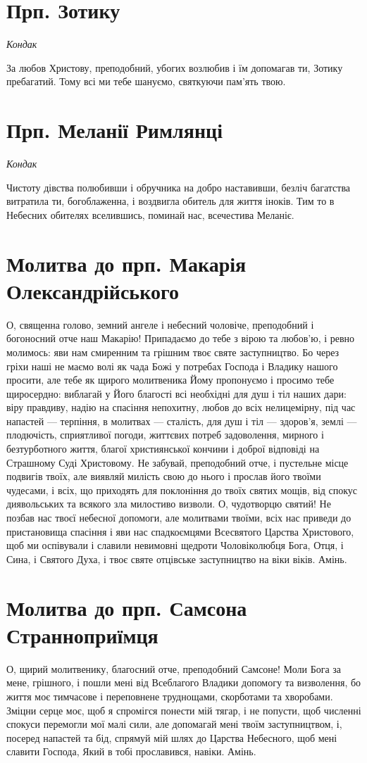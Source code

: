\documentclass[chapters.tex]{subfiles}
\begin{document}
\section{Прп. Зотику}
\emph{Кондак}

За любов Христову, преподобний, убогих возлюбив і їм допомагав ти, Зотику пребагатий. Тому всі ми тебе шануємо, святкуючи пам’ять твою.

\section{Прп. Меланії Римлянці}
\emph{Кондак}

Чистоту дівства полюбивши і обручника на добро наставивши, безліч багатства витратила ти, богоблаженна, і воздвигла обитель для життя іноків. Тим то в Небесних обителях вселившись, поминай нас, всечестива Меланіє.

\section{Молитва до прп. Макарія Олександрійського}
О, священна голово, земний ангеле і небесний чоловіче, преподобний і богоносний отче наш Макарію! Припадаємо до тебе з вірою та любов’ю, і ревно молимось: яви нам смиренним та грішним твоє святе заступництво. Бо через гріхи наші не маємо волі як чада Божі у потребах Господа і Владику нашого просити, але тебе як щирого молитвеника Йому пропонуємо і просимо тебе щиросердно: виблагай у Його благості всі необхідні для душ і тіл наших дари: віру правдиву, надію на спасіння непохитну, любов до всіх нелицемірну, під час напастей — терпіння, в молитвах — сталість, для душ і тіл — здоров’я, землі — плодючість, сприятливої погоди, життєвих потреб задоволення, мирного і безтурботного життя, благої християнської кончини і доброї відповіді на Страшному Суді Христовому. Не забувай, преподобний отче, і пустельне місце подвигів твоїх, але виявляй милість свою до нього і прослав його твоїми чудесами, і всіх, що приходять для поклоніння до твоїх святих мощів, від спокус диявольських та всякого зла милостиво визволи. О, чудотворцю святий! Не позбав нас твоєї небесної допомоги, але молитвами твоїми, всіх нас приведи до пристановища спасіння і яви нас спадкоємцями Всесвятого Царства Христового, щоб ми оспівували і славили невимовні щедроти Чоловіколюбця Бога, Отця, і Сина, і Святого Духа, і твоє святе отцівське заступництво на віки віків. Амінь.

\section{Молитва до прп. Самсона Странноприїмця}
О, щирий молитвенику, благосний отче, преподобний Самсоне! Моли Бога за мене, грішного, і пошли мені від Всеблагого Владики допомогу та визволення, бо життя моє тимчасове і переповнене труднощами, скорботами та хворобами. Зміцни серце моє, щоб я спромігся понести мій тягар, і не попусти, щоб численні спокуси перемогли мої малі сили, але допомагай мені твоїм заступництвом, і, посеред напастей та бід, спрямуй мій шлях до Царства Небесного, щоб мені славити Господа, Який в тобі прославився, навіки. Амінь.
\end{document}
